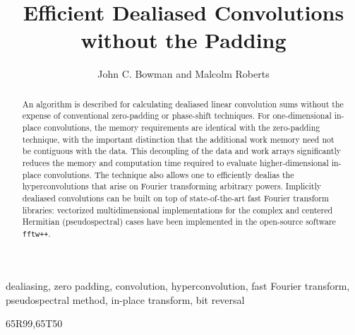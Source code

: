 \documentclass[final]{siamltex}
\begin{document}
\title{Efficient Dealiased Convolutions without the Padding}
\author{John C. Bowman and Malcolm Roberts}
\maketitle

\begin{abstract}
An algorithm is described for calculating dealiased linear convolution sums
without the expense of conventional zero-padding or phase-shift
techniques. For one-dimensional in-place convolutions, the memory
requirements are identical with the zero-padding technique, with the important
distinction that the additional work memory need not be contiguous with the
data. This decoupling of the data and work arrays significantly reduces
the memory and computation time required to evaluate higher-dimensional
in-place convolutions. The technique also allows one to efficiently dealias the
hyperconvolutions that arise on Fourier transforming arbitrary powers.
Implicitly dealiased convolutions can be built on top of state-of-the-art
fast Fourier transform libraries: vectorized multidimensional implementations
for the complex and centered Hermitian (pseudospectral) cases have
been implemented in the open-source software {\tt fftw++}.
\end{abstract} 

\begin{keywords} 
dealiasing, zero padding, convolution, hyperconvolution, fast Fourier transform,
pseudospectral method, in-place transform, bit reversal
\end{keywords}

\begin{AMS}
65R99,65T50
\end{AMS}

\pagestyle{myheadings}



% 


%


%
\end{document}
